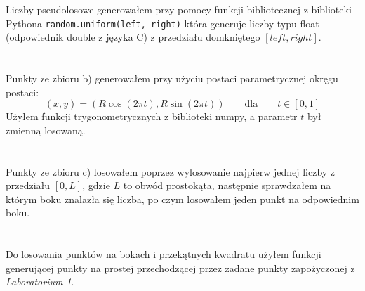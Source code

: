 \documentclass[a4paper]{article}
\begin{document}
\noindent Liczby pseudolosowe generowałem przy pomocy funkcji bibliotecznej z biblioteki
Pythona \verb|random.uniform(left, right)| która generuje liczby typu float (odpowiednik double z języka C) 
z przedziału domkniętego $[left, right]$.
\\\\\\
\noindent Punkty ze zbioru b) generowałem przy użyciu postaci parametrycznej okręgu postaci: 
\[
(x,y)=(R\cos(2\pi t),R\sin(2\pi t)) \qquad \text{dla} \qquad t \in [0,1]
\]
Użyłem funkcji trygonometrycznych z biblioteki numpy, a parametr $t$ był zmienną losowaną.
\\\\\\
\noindent Punkty ze zbioru c) losowałem poprzez wylosowanie najpierw jednej liczby z przedziału
$[0, L]$, gdzie $L$ to obwód prostokąta, następnie sprawdzałem na którym boku znalazła się liczba,
po czym losowałem jeden punkt na odpowiednim boku.
\\\\\\
\noindent Do losowania punktów na bokach i przekątnych kwadratu użyłem funkcji generującej punkty na prostej
przechodzącej przez zadane punkty zapożyczonej z \textit{Laboratorium 1}.
\end{document}
